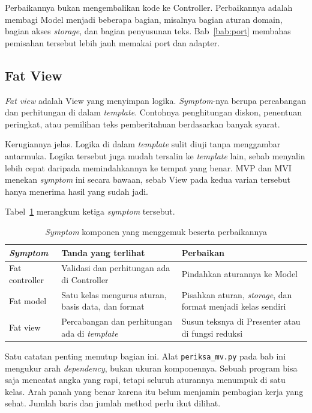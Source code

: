 Perbaikannya bukan mengembalikan kode ke Controller. Perbaikannya adalah membagi
Model menjadi beberapa bagian, misalnya bagian aturan domain, bagian akses
\textit{storage}, dan bagian penyusunan teks. Bab~\ref{bab:port} membahas pemisahan
tersebut lebih jauh memakai port dan adapter.

\subsection{Fat View}

\textit{Fat view} adalah View yang menyimpan logika. \textit{Symptom}-nya berupa
percabangan dan perhitungan di dalam \textit{template}. Contohnya penghitungan diskon,
penentuan peringkat, atau pemilihan teks pemberitahuan berdasarkan banyak syarat.

Kerugiannya jelas. Logika di dalam \textit{template} sulit diuji tanpa menggambar
antarmuka. Logika tersebut juga mudah tersalin ke \textit{template} lain, sebab menyalin
lebih cepat daripada memindahkannya ke tempat yang benar. MVP dan MVI menekan
\textit{symptom} ini secara bawaan, sebab View pada kedua varian tersebut hanya menerima
hasil yang sudah jadi.

Tabel~\ref{tab:gemuk} merangkum ketiga \textit{symptom} tersebut.

\begin{table}[htbp]
  \centering
  \caption{\textit{Symptom} komponen yang menggemuk beserta perbaikannya}
  \label{tab:gemuk}
  \begin{tabularx}{\textwidth}{|l|X|X|}
    \hline
    \textbf{\textit{Symptom}} & \textbf{Tanda yang terlihat} & \textbf{Perbaikan} \\
    \hline
    Fat controller & Validasi dan perhitungan ada di Controller & Pindahkan aturannya ke Model \\
    \hline
    Fat model & Satu kelas mengurus aturan, basis data, dan format & Pisahkan aturan, \textit{storage}, dan format menjadi kelas sendiri \\
    \hline
    Fat view & Percabangan dan perhitungan ada di \textit{template} & Susun teksnya di Presenter atau di fungsi reduksi \\
    \hline
  \end{tabularx}
\end{table}

Satu catatan penting menutup bagian ini. Alat \texttt{periksa\_mv.py} pada bab
ini mengukur arah \textit{dependency}, bukan ukuran komponennya. Sebuah program bisa
saja mencatat angka yang rapi, tetapi seluruh aturannya menumpuk di satu kelas.
Arah panah yang benar karena itu belum menjamin pembagian kerja yang sehat.
Jumlah baris dan jumlah method perlu ikut dilihat.

